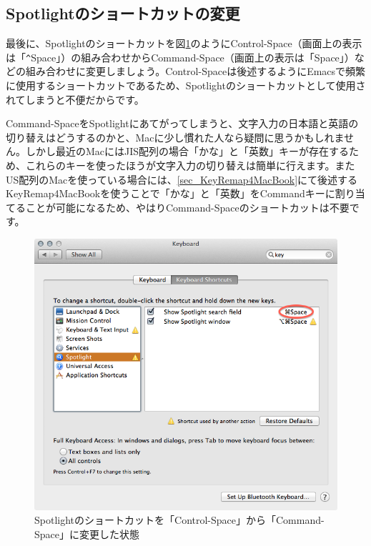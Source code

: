 \subsection{Spotlightのショートカットの変更}
最後に、Spotlightのショートカットを図\ref{fig_Keyboard3_png}のようにControl-Space（画面上の表示は「\verb|^|Space」）の組み合わせからCommand-Space（画面上の表示は「\cmd{}Space」）などの組み合わせに変更しましょう。Control-Spaceは後述するようにEmacsで頻繁に使用するショートカットであるため、Spotlightのショートカットとして使用されてしまうと不便だからです。

Command-SpaceをSpotlightにあてがってしまうと、文字入力の日本語と英語の切り替えはどうするのかと、Macに少し慣れた人なら疑問に思うかもしれません。しかし最近のMacにはJIS配列の場合「かな」と「英数」キーが存在するため、これらのキーを使ったほうが文字入力の切り替えは簡単に行えます。またUS配列のMacを使っている場合には、\ref{sec_KeyRemap4MacBook}にて後述するKeyRemap4MacBookを使うことで「かな」と「英数」をCommandキーに割り当てることが可能になるため、やはりCommand-Spaceのショートカットは不要です。

\begin{figure}
  \begin{center}
    \includegraphics[scale=0.35,bb= 0 0 668 636]{fig/Keyboard3.png}
    \caption{Spotlightのショートカットを「Control-Space」から「Command-Space」に変更した状態}
    \label{fig_Keyboard3_png}
  \end{center}
\end{figure}

